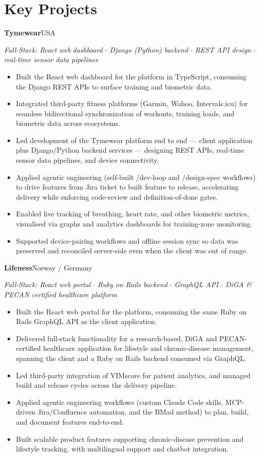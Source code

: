 \documentclass[a4paper,10pt]{article}
\newcommand{\entry}[2]{\textbf{#1}\hfill{\small #2}\par}
\begin{document}
\section*{Key Projects}
\entry{Tymewear}{USA}
{\small\itshape Full-Stack: React web dashboard $\cdot$ Django (Python) backend $\cdot$ REST API design $\cdot$ real-time sensor data pipelines}
\begin{itemize}
  \item Built the React web dashboard for the platform in TypeScript, consuming the Django REST APIs to surface training and biometric data.
  \item Integrated third-party fitness platforms (Garmin, Wahoo, Intervals.icu) for seamless bidirectional synchronization of workouts, training loads, and biometric data across ecosystems.
  \item Led development of the Tymewear platform end to end --- client application plus Django/Python backend services --- designing REST APIs, real-time sensor data pipelines, and device connectivity.
  \item Applied agentic engineering (self-built /dev-loop and /design-spec workflows) to drive features from Jira ticket to built feature to release, accelerating delivery while enforcing code-review and definition-of-done gates.
  \item Enabled live tracking of breathing, heart rate, and other biometric metrics, visualised via graphs and analytics dashboards for training-zone monitoring.
  \item Supported device-pairing workflows and offline session sync so data was preserved and reconciled server-side even when the client was out of range.
\end{itemize}
\entry{Lifeness}{Norway / Germany}
{\small\itshape Full-Stack: React web portal $\cdot$ Ruby on Rails backend $\cdot$ GraphQL API $\cdot$ DiGA \& PECAN certified healthcare platform}
\begin{itemize}
  \item Built the React web portal for the platform, consuming the same Ruby on Rails GraphQL API as the client application.
  \item Delivered full-stack functionality for a research-based, DiGA and PECAN-certified healthcare application for lifestyle and chronic-disease management, spanning the client and a Ruby on Rails backend consumed via GraphQL.
  \item Led third-party integration of VIMscore for patient analytics, and managed build and release cycles across the delivery pipeline.
  \item Applied agentic engineering workflows (custom Claude Code skills, MCP-driven Jira/Confluence automation, and the BMad method) to plan, build, and document features end-to-end.
  \item Built scalable product features supporting chronic-disease prevention and lifestyle tracking, with multilingual support and chatbot integration.
\end{itemize}
\end{document}
